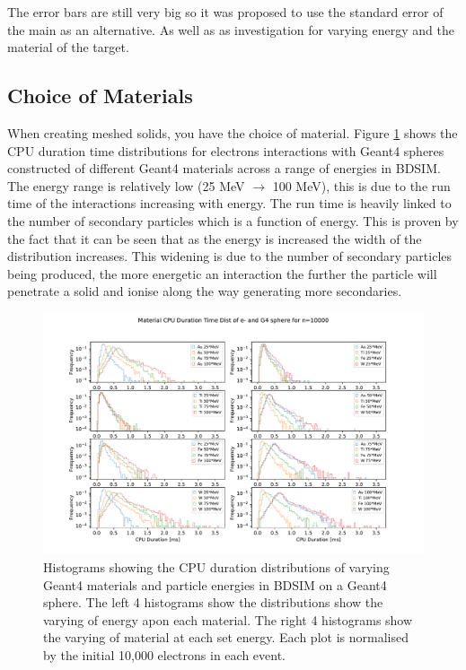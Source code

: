 \documentclass[12pt,a4paper]{article}
\begin{document}
The error bars are still very big so it was proposed to use the standard error of the main as an alternative. As well as as investigation for varying energy and the material of the target.

\subsection{Choice of Materials}
When creating meshed solids, you have the choice of material. Figure \ref{novar} shows the CPU duration time distributions for electrons interactions with Geant4 spheres constructed of different Geant4 materials across a range of energies in BDSIM. The energy range is relatively low (25 MeV $\rightarrow$ 100 MeV), this is due to the run time of the interactions increasing with energy. The run time is heavily linked to the number of secondary particles which is a function of energy. This is proven by the fact that it can be seen that as the energy is increased the width of the distribution increases. This widening is due to the number of secondary particles being produced, the more energetic an interaction the further the particle will penetrate a solid and ionise along the way generating more secondaries.

\begin{figure}[h!]
\centering
\includegraphics[scale=0.6]{Images//Materials//not_Varied_by_radius_and_secondaries.pdf}
\caption[width=\columnwidth]{Histograms showing the CPU duration distributions of varying Geant4 materials and particle energies in BDSIM on a Geant4 sphere. The left 4 histograms show the distributions show the varying of energy apon each material. The right 4 histograms show the varying of material at each set energy. Each plot is normalised by the initial 10,000 electrons in each event.}
\label{novar}
\end{figure}
\end{document}
